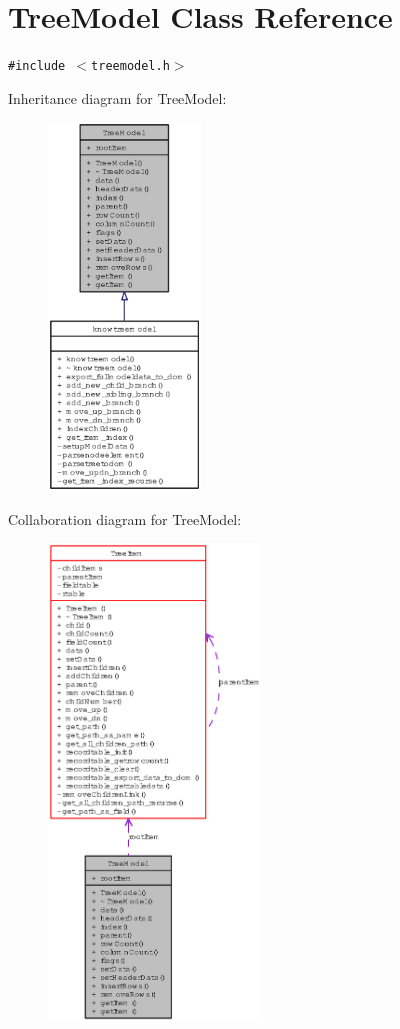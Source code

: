 \section{Tree\-Model Class Reference}
\label{classTreeModel}
{\tt \#include $<$treemodel.h$>$}

Inheritance diagram for Tree\-Model:\begin{figure}[H]
\begin{center}
\leavevmode
\includegraphics[width=115pt]{classTreeModel__inherit__graph}
\end{center}
\end{figure}
Collaboration diagram for Tree\-Model:\begin{figure}[H]
\begin{center}
\leavevmode
\includegraphics[width=160pt]{classTreeModel__coll__graph}
\end{center}
\end{figure}
